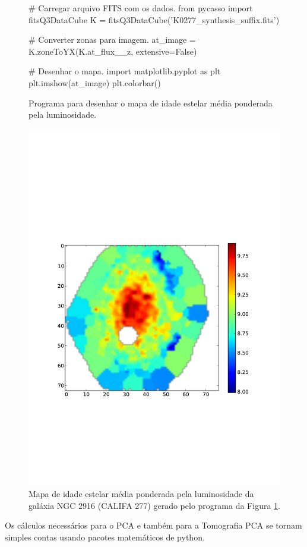 \begin{figure}
\begin{python}
# Carregar arquivo FITS com os dados.
from pycasso import fitsQ3DataCube
K = fitsQ3DataCube('K0277_synthesis_suffix.fits')

# Converter zonas para imagem.
at_image = K.zoneToYX(K.at_flux__z, extensive=False)

# Desenhar o mapa.
import matplotlib.pyplot as plt
plt.imshow(at_image)
plt.colorbar()
\end{python}
	\caption[Programa idade estelar média]
	{Programa para desenhar o mapa de idade	estelar média ponderada pela 
	luminosidade.}
	\label{fig:programaMapaIdade}
\end{figure}

\begin{figure}
	\includegraphics{figuras/figmeanStellarAge.pdf}
	\caption[Mapa da idade estelar média da galáxia NGC 2916] {Mapa de idade
	estelar média ponderada pela luminosidade da galáxia NGC 2916 (CALIFA 277)
	gerado pelo programa da Figura \ref{fig:programaMapaIdade}.}
	\label{fig:mapaIdade}
\end{figure}

Os cálculos necessários para o PCA e também para a Tomografia PCA se tornam
simples contas usando pacotes matemáticos de python. 

